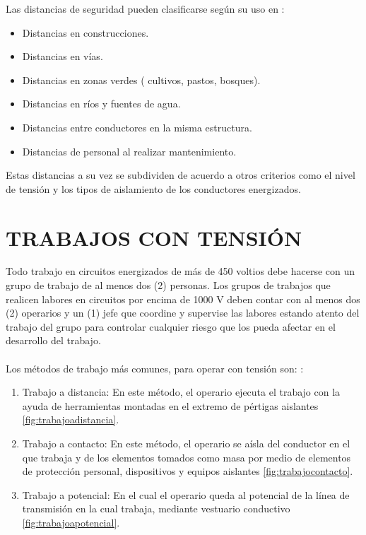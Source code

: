 \documentclass[a5paper]{book}%
\begin{document}
Las distancias de seguridad pueden clasificarse según su uso en :

\begin{itemize}
\item Distancias en construcciones.
\item Distancias en vías.
\item Distancias en zonas verdes ( cultivos, pastos, bosques).
\item Distancias en ríos y fuentes de agua.
\item Distancias entre conductores en la misma estructura.
\item Distancias de personal al realizar mantenimiento.
\end{itemize}

Estas distancias a su vez se subdividen de acuerdo a otros criterios como el nivel de tensión y los tipos de aislamiento de los conductores energizados.

\section{TRABAJOS CON TENSIÓN}

Todo trabajo en circuitos energizados de más de 450 voltios debe hacerse con un grupo de trabajo de al menos dos (2) personas. Los grupos de trabajos que realicen labores en circuitos por encima de 1000 V deben contar con al menos dos (2) operarios y un (1) jefe que coordine y supervise las labores estando atento del trabajo del grupo para controlar cualquier riesgo que los pueda afectar en
el desarrollo del trabajo.  \cite{RETIE2013}\\\\

Los métodos de trabajo más comunes, para operar con tensión son: \cite{RETIE2013}:

\begin{enumerate}
	\item Trabajo a distancia: En este método, el operario ejecuta
          el trabajo con la ayuda de herramientas montadas en el
          extremo de pértigas aislantes \ref{fig:trabajoadistancia}.
	\item Trabajo a contacto: En este método, el operario se aísla
          del conductor en el que trabaja y de los elementos tomados
          como masa por medio de elementos de protección personal,
          dispositivos y equipos aislantes \ref{fig:trabajocontacto}.
	\item Trabajo a potencial: En el cual el operario queda al
          potencial de la línea de transmisión en la cual trabaja,
          mediante vestuario conductivo \ref{fig:trabajoapotencial}.
        \end{enumerate}
\end{document}
